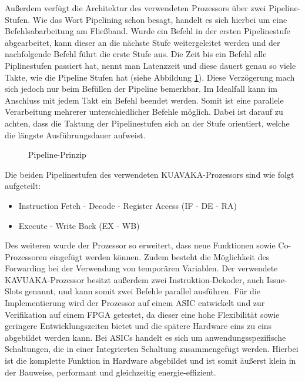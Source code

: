 Außerdem verfügt die Architektur des verwendeten Prozessors über zwei Pipeline-Stufen.
Wie das Wort Pipelining schon besagt, handelt es sich hierbei um eine Befehlsabarbeitung am Fließband. Wurde ein Befehl in der ersten Pipelinestufe abgearbeitet, kann dieser an die nächste Stufe weitergeleitet werden und der nachfolgende Befehl führt die erste Stufe aus. Die Zeit bis ein Befehl alle Piplinestufen passiert hat, nennt man Latenzzeit und diese dauert genau so viele Takte, wie die Pipeline Stufen hat (siehe Abbildung \ref{fig:pipeline}). Diese Verzögerung mach sich jedoch nur beim Befüllen der Pipeline bemerkbar. Im Idealfall kann im Anschluss mit jedem Takt ein Befehl beendet werden. Somit ist eine parallele Verarbeitung mehrerer unterschiedlicher Befehle möglich. Dabei ist darauf zu achten, dass die Taktung der Pipelinestufen sich an der Stufe orientiert, welche die längste Ausführungsdauer aufweist. \cite[Seite 204]{wust2010mikroprozessortechnik}
	\begin{figure}[H] 
		\centering
		
		\caption{Pipeline-Prinzip}
		\label{fig:pipeline}
	\end{figure}
\newpage
Die beiden Pipelinestufen des verwendeten KUAVAKA-Prozessors sind wie folgt aufgeteilt:
\begin{itemize}
	\item[1.] Instruction Fetch - Decode - Register Access (IF - DE - RA) 
	\item[2.] Execute - Write Back (EX - WB)
\end{itemize}

Des weiteren wurde der Prozessor so erweitert, dass neue Funktionen sowie Co-Prozessoren eingefügt werden können. Zudem besteht die Möglichkeit des Forwarding bei der Verwendung von temporären Variablen.
Der verwendete KAVUAKA-Prozessor besitzt außerdem zwei Instruktion-Dekoder, auch Issue-Slots genannt, und kann somit zwei Befehle parallel ausführen.
Für die Implementierung wird der Prozessor auf einem ASIC entwickelt und zur Verifikation auf einem FPGA getestet, da dieser eine hohe Flexibilität sowie geringere Entwicklungszeiten bietet und die spätere Hardware eins zu eins abgebildet werden kann.\cite{lukasglitches2017}
Bei ASICs handelt es sich um anwendungsspezifische Schaltungen, die in einer Integrierten Schaltung zusammengefügt werden. Hierbei ist die komplette Funktion in Hardware abgebildet und ist somit äußerst klein in der Bauweise, performant und gleichzeitig energie-effizient. 


\newpage

